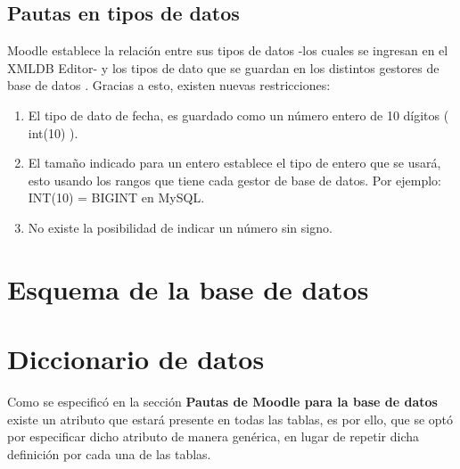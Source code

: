 \subsection{Pautas en tipos de datos}
        
         Moodle establece la relación entre sus tipos de datos -los cuales se ingresan en el XMLDB Editor- y los tipos de dato que se guardan en los distintos gestores de base de datos \cite{moodleTiposBD}.  Gracias a esto, existen nuevas restricciones:
        \begin{enumerate}
            \item El tipo de dato de fecha, es guardado como un número entero de 10 dígitos ( int(10) ).
            \item El tamaño indicado para un entero establece el tipo de entero que se usará, esto usando los rangos que tiene cada gestor de base de datos. Por ejemplo: INT(10) = BIGINT en MySQL.
            \item No existe la posibilidad de indicar un número sin signo.
        \end{enumerate}
        
\clearpage        
\section{Esquema de la base de datos}
    
    

\clearpage

\section{Diccionario de datos}
    
    Como se especificó en la sección \textbf{Pautas de Moodle para la base de datos} existe un atributo que estará presente en todas las tablas, es por ello, que se optó por especificar dicho atributo de manera genérica, en lugar de repetir dicha definición por cada una de las tablas.\\
    
